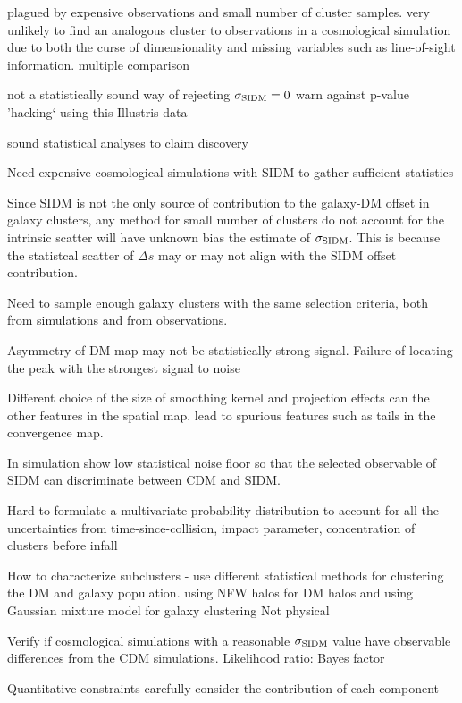 plagued by expensive observations and small number of cluster samples.
very unlikely to find an analogous cluster to observations in a cosmological simulation 
due to both the curse of dimensionality and missing variables such as
line-of-sight information.
multiple comparison 

not a statistically sound way of rejecting $\sigma_{\rm SIDM} = 0$
warn against p-value 'hacking` using this Illustris data


sound statistical analyses to claim discovery  

Need expensive cosmological simulations with SIDM to gather sufficient statistics 


Since SIDM is not the only source of contribution to the galaxy-DM offset 
in galaxy clusters,
any method for small number of clusters do not account for the intrinsic 
scatter will have unknown bias the estimate of $\sigma_{\rm SIDM}$. 
This is because the statistcal scatter of $\Delta s$ may or may 
not align with the SIDM offset contribution. 

Need to sample enough galaxy clusters with the same selection criteria, 
both from simulations and from observations.

Asymmetry of DM map may not be statistically strong signal.
Failure of locating the peak with the strongest signal to noise 


Different choice of the size of smoothing kernel and projection effects can the
other features in the spatial map.
lead to spurious features such as tails in the convergence map.

In simulation 
show low statistical noise floor so that 
the selected observable of SIDM can discriminate between CDM and SIDM.   

Hard to formulate a multivariate probability distribution to account for all
the uncertainties from 
time-since-collision, impact parameter, concentration of clusters before infall

How to characterize subclusters - 
use different statistical methods for clustering the DM and galaxy 
population. 
using NFW halos for DM halos and using
Gaussian mixture model for galaxy clustering  
Not physical


Verify if cosmological simulations with a reasonable $\sigma_{\rm SIDM}$ value 
have observable differences from the CDM simulations. 
Likelihood ratio: Bayes factor 

Quantitative constraints carefully consider the contribution of each component

